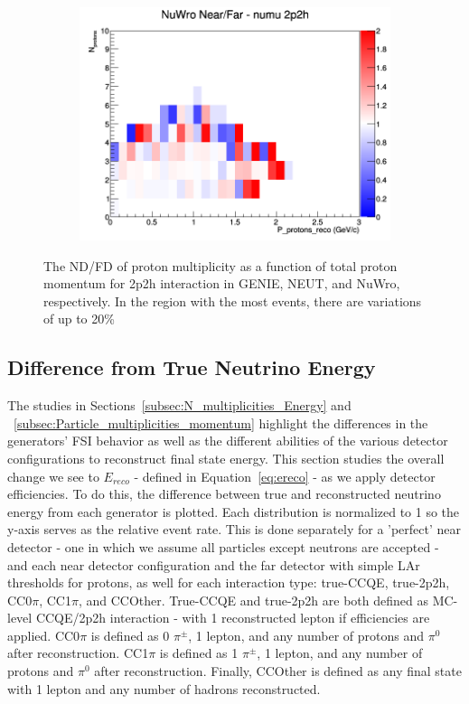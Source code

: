 \documentclass[12pt]{article}
\begin{document}
\begin{figure}[h]
\begin{subfigure}[b]{0.32\textwidth}
\includegraphics[width=\linewidth]{eff_N_P/LAr/protons/ratios/2p2h_NuWro_numu_NF_N_P.png}
\end{subfigure}
\caption{The ND/FD of proton multiplicity as a function of total proton momentum for 2p2h interaction in GENIE, NEUT, and NuWro, respectively. In the region with the most events, there are variations of up to 20\%}
\label{fig:proton_multiplicity_2p2h_NF_eff}
\end{figure}



\subsection{Difference from True Neutrino Energy}
\label{subsec:EDiff}
The studies in Sections~\ref{subsec:N_multiplicities_Energy} and ~\ref{subsec:Particle_multiplicities_momentum} highlight the differences in the generators' FSI behavior as well as the different abilities of the various detector configurations to reconstruct final state energy. This section studies the overall change we see to $E_{reco}$ - defined in Equation~\ref{eq:ereco} - as we apply detector efficiencies. To do this, the difference between true and reconstructed neutrino energy from each generator is plotted. Each distribution is normalized to 1 so the y-axis serves as the relative event rate. This is done separately for a 'perfect' near detector - one in which we assume all particles except neutrons are accepted - and each near detector configuration and the far detector with simple LAr thresholds for protons, as well for each interaction type: true-CCQE, true-2p2h, CC0$\pi$, CC1$\pi$, and CCOther. True-CCQE and true-2p2h are both defined as MC-level CCQE/2p2h interaction - with 1 reconstructed lepton if efficiencies are applied. CC0$\pi$ is defined as 0 $\pi^{\pm}$, 1 lepton, and any number of protons and $\pi^0$ after reconstruction. CC1$\pi$ is defined as 1 $\pi^{\pm}$, 1 lepton, and any number of protons and $\pi^0$ after reconstruction. Finally, CCOther is defined as any final state with 1 lepton and any number of hadrons reconstructed.
\end{document}
